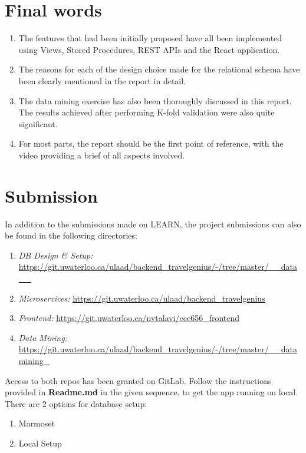 \documentclass[conference]{IEEEtran}
\begin{document}
{\section{\textbf{Final words}}
	\begin{enumerate}
                 \item The features that had been initially proposed have all been implemented using Views, Stored Procedures, REST APIs and the React application.
                 \item The reasons for each of the design choice made for the relational schema have been clearly mentioned in the report in detail.
                 \item The data mining exercise has also been thoroughly discussed in this report. The results achieved after performing K-fold validation were also quite significant.
	      \item For most parts, the report should be the first point of reference, with the video providing a brief of all aspects involved.
	\end{enumerate}


\section{\textbf{Submission}}\label{sec_submission}
	In addition to the submissions made on LEARN, the project submissions can also be found in the following directories:
	\begin{enumerate}
            \item \textit{\small DB Design \& Setup: } {\tiny \url{https://git.uwaterloo.ca/ulaad/backend_travelgenius/-/tree/master/__data__}}
            \item \textit{\small Microservices: } {\tiny \url{https://git.uwaterloo.ca/ulaad/backend_travelgenius}}
            \item \textit{\small Frontend: } {\tiny \url{https://git.uwaterloo.ca/nvtalavi/ece656_frontend}}
	      \item \textit{\small Data Mining: } {\tiny \url{https://git.uwaterloo.ca/ulaad/backend_travelgenius/-/tree/master/__datamining_}}
	\end{enumerate}
	
	\vspace{1mm}

	Access to both repos has been granted on GitLab. Follow the instructions provided in \textbf{Readme.md} in the given sequence, to get the app running on local. There are 2 options for database setup:
	\begin{enumerate}
            \item Marmoset
            \item Local Setup
	\end{enumerate}
	
}
\end{document}
